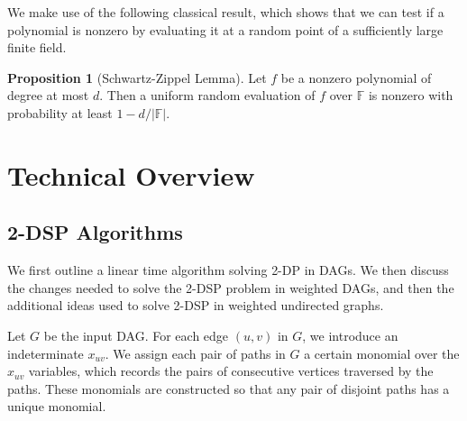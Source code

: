 \documentclass[11pt]{article}
\theoremstyle{definition}
\newtheorem{proposition}[theorem]{Proposition}
\begin{document}
We make use of the following classical result, which shows that we can test if a polynomial is nonzero by evaluating it at a random point of a sufficiently large finite field. 

\begin{proposition}[Schwartz-Zippel Lemma]
\label{obvious}
    Let $f$ be a nonzero polynomial of degree at most $d$.
    Then a uniform random evaluation of $f$ over $\mathbb{F}$ is nonzero with probability at least $1-d/|\mathbb{F}|$.
\end{proposition}







\section{Technical Overview}
\label{sec:overview}

\subsection{2-DSP Algorithms}

We first outline a linear time algorithm solving \textsf{2-DP} in DAGs.
We then discuss the changes needed to solve the \textsf{2-DSP} problem in weighted DAGs, and then the additional ideas used to solve \textsf{2-DSP} in weighted undirected graphs.

Let $G$ be the input DAG.
For each edge $(u,v)$ in $G$, we introduce an indeterminate $x_{uv}$.
We assign each pair of paths in $G$ a certain monomial over the $x_{uv}$ variables, which records the pairs of consecutive vertices traversed by the paths.
These monomials are constructed so that any pair of disjoint paths has a unique monomial.
\end{document}
